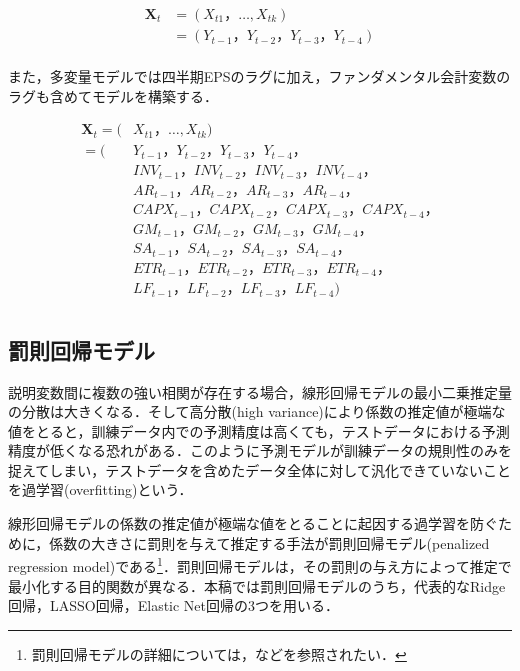 \documentclass[a4paper，11pt]{jsarticle}
\begin{document}
\begin{equation}
  \begin{split}
    \bm{X}_t &= (X_{t1}，\ldots ,X_{tk}) \\
    &= (Y_{t-1}，Y_{t-2}，Y_{t-3}，Y_{t-4}) \\
  \end{split}
\end{equation}

また，多変量モデルでは四半期EPSのラグに加え，ファンダメンタル会計変数のラグも含めてモデルを構築する．

\begin{equation}
  \begin{split}
    \bm{X}_t = (&X_{t1}，\ldots ,X_{tk}) \\ 
    =(&Y_{t-1}，Y_{t-2}，Y_{t-3}，Y_{t-4}，\\
    & INV_{t-1}，INV_{t-2}，INV_{t-3}，INV_{t-4}，\\
    & AR_{t-1}，AR_{t-2}，AR_{t-3}，AR_{t-4}，\\
    & CAPX_{t-1}，CAPX_{t-2}，CAPX_{t-3}，CAPX_{t-4}，\\
    & GM_{t-1}，GM_{t-2}，GM_{t-3}，GM_{t-4}，\\
    & SA_{t-1}，SA_{t-2}，SA_{t-3}，SA_{t-4}，\\
    & ETR_{t-1}，ETR_{t-2}，ETR_{t-3}，ETR_{t-4}，\\ 
    & LF_{t-1}，LF_{t-2}，LF_{t-3}，LF_{t-4}) \\
  \end{split}
\end{equation}

\subsection{罰則回帰モデル}

説明変数間に複数の強い相関が存在する場合，線形回帰モデルの最小二乗推定量の分散は大きくなる．そして高分散(high variance)により係数の推定値が極端な値をとると，訓練データ内での予測精度は高くても，テストデータにおける予測精度が低くなる恐れがある．このように予測モデルが訓練データの規則性のみを捉えてしまい，テストデータを含めたデータ全体に対して汎化できていないことを過学習(overfitting)という．

線形回帰モデルの係数の推定値が極端な値をとることに起因する過学習を防ぐために，係数の大きさに罰則を与えて推定する手法が罰則回帰モデル(penalized regression model)である\footnote{罰則回帰モデルの詳細については，\cite*{hoerl1970ridge, tibshirani1996regression, zou2005regularization}などを参照されたい．}．罰則回帰モデルは，その罰則の与え方によって推定で最小化する目的関数が異なる．本稿では罰則回帰モデルのうち，代表的なRidge回帰，LASSO回帰，Elastic Net回帰の3つを用いる．
\end{document}
